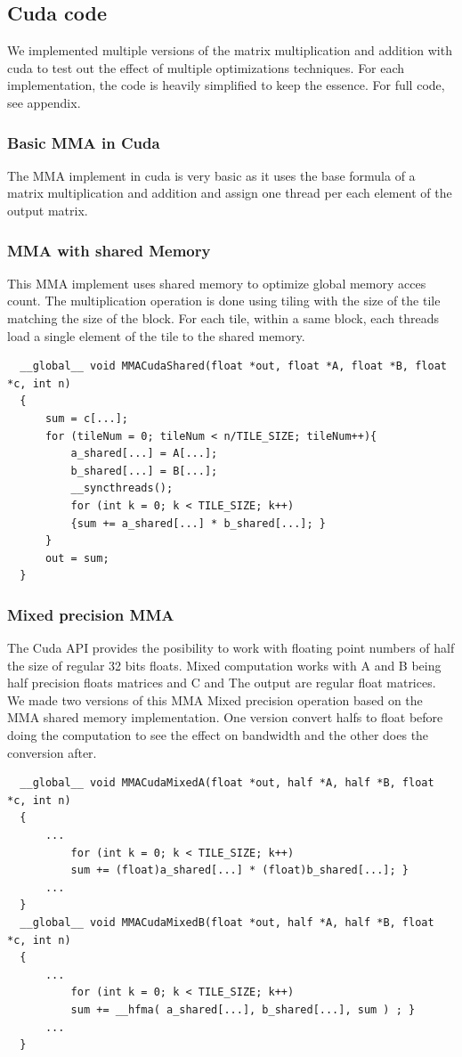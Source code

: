 \documentclass[conference]{IEEEtran}
\begin{document}
  \subsection{Cuda code}\label{sec:CudaCode}
  We implemented multiple versions of the matrix multiplication and addition with cuda to
  test out the effect of multiple optimizations techniques. For each implementation, 
  the code is heavily simplified to keep the essence. For full code, see appendix.

  \subsubsection[short]{Basic MMA in Cuda}
  The MMA implement in cuda is very basic as it uses the base formula of a matrix multiplication
  and addition and assign one thread per each element of the output matrix.\cite{Cpp_programming}


  \subsubsection[short]{MMA with shared Memory}
  This MMA implement uses shared memory to optimize global memory acces count. The multiplication operation 
  is done using tiling with the size of the tile matching the size of the block. For each tile, within
  a same block, each threads load a single element of the tile to the shared memory. 
  \begin{lstlisting}
  __global__ void MMACudaShared(float *out, float *A, float *B, float *c, int n)
  {   
      sum = c[...];
      for (tileNum = 0; tileNum < n/TILE_SIZE; tileNum++){
          a_shared[...] = A[...];
          b_shared[...] = B[...];
          __syncthreads();
          for (int k = 0; k < TILE_SIZE; k++)
          {sum += a_shared[...] * b_shared[...]; }
      }
      out = sum;
  }   
  \end{lstlisting}

  \subsubsection[short]{Mixed precision MMA}
  The Cuda API provides the posibility to work with floating point numbers of half the size of regular 32 bits floats.
  Mixed computation works with A and B being half precision floats matrices and C and The output are regular float matrices.
  We made two versions of this MMA Mixed precision operation based on the MMA shared memory implementation. One version
  convert halfs to float before doing the computation to see the effect on bandwidth and the other does the conversion after. 
  \begin{lstlisting}
  __global__ void MMACudaMixedA(float *out, half *A, half *B, float *c, int n)
  {   
      ...
          for (int k = 0; k < TILE_SIZE; k++)
          sum += (float)a_shared[...] * (float)b_shared[...]; }
      ...
  }
  __global__ void MMACudaMixedB(float *out, half *A, half *B, float *c, int n)
  {   
      ...
          for (int k = 0; k < TILE_SIZE; k++)
          sum += __hfma( a_shared[...], b_shared[...], sum ) ; }
      ...
  }
  \end{lstlisting}
\end{document}
